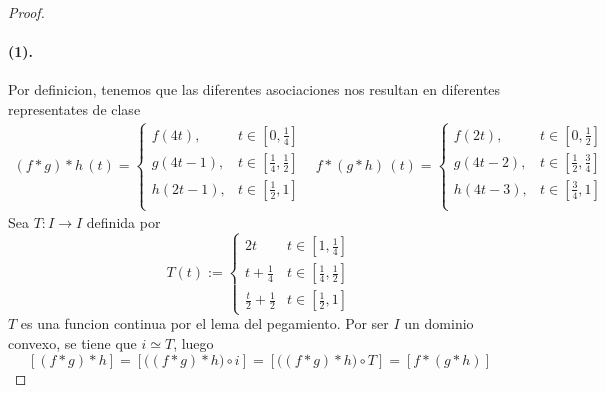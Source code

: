 \begin{proof}
\paragraph{(1).}
Por definicion, tenemos que las diferentes asociaciones nos resultan en
diferentes representates de clase
\[
  \begin{matrix}
    (f * g) * h \, (t) =
    \begin{cases}
      f (4t), & t \in [0, \frac 1 4] \\
      g (4t - 1), & t \in [\frac 1 4, \frac 1 2] \\
      h (2t - 1), & t \in [\frac 1 2, 1] \\
    \end{cases} &
    f * (g * h) \, (t) =
    \begin{cases}
      f (2t), & t \in [0, \frac 1 2] \\
      g (4t - 2), & t \in [\frac 1 2, \frac 3 4] \\
      h (4t - 3), & t \in [\frac 3 4, 1] \\
    \end{cases}
  \end{matrix}
\]
Sea \(T : I \to I\) definida por
\[ T (t) :=
  \begin{cases}
    2t & t \in [1 , \frac 1 4] \\
    t + \frac 1 4 & t \in [\frac 1 4, \frac 1 2] \\
    \frac t 2 + \frac 1 2 & t \in [\frac 1 2, 1]
  \end{cases}
\]
\(T\) es una funcion continua por el lema del pegamiento. Por ser \(I\)
un dominio convexo, se tiene que \(i \simeq T\), luego
\[ [(f * g) * h] = [\big( (f * g) * h \big) \circ i] = [\big( (f * g) *
  h \big) \circ T ] = [f * (g * h)] \]
\end{proof}
